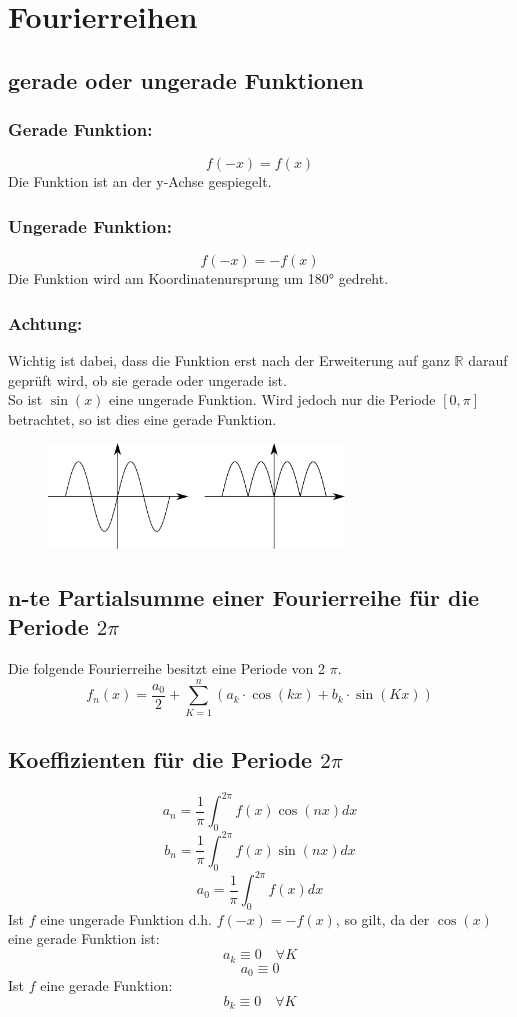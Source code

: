 \section{Fourierreihen}

\subsection{gerade oder ungerade Funktionen}

\subsubsection{Gerade Funktion: }
\[ \boxed{f(-x) = f(x)} \]
Die Funktion ist an der y-Achse gespiegelt. 
\subsubsection{Ungerade Funktion: }
\[ \boxed{f(-x) = -f(x)} \]
Die Funktion wird am Koordinatenursprung um 180° gedreht. 
\subsubsection{Achtung: }
Wichtig ist dabei, dass die Funktion erst nach der Erweiterung auf ganz $\mathbb{R}$ darauf geprüft wird, ob sie gerade oder ungerade ist. \\
So ist $\sin(x)$ eine ungerade Funktion. Wird jedoch nur die Periode $[0, \pi]$ betrachtet, so ist dies eine gerade Funktion. 

\begin{figure}[h!]
\centering
\includegraphics[width=0.7\textwidth]{geradeungerade.pdf}
\end{figure}

\subsection{n-te Partialsumme einer Fourierreihe für die Periode $2\pi$}
Die folgende Fourierreihe besitzt eine Periode von 2 $\pi$. 
\[ \boxed{f_n(x) = \frac{a_0}{2} + \sum_{K=1}^n \left(a_k \cdot \cos(kx) + b_k \cdot \sin(Kx)\right)} \]

\subsection{Koeffizienten für die Periode $2\pi$}
\[ \boxed{a_n = \frac{1}{\pi} \int_0^{2 \pi} f(x) \cos(nx) dx} \]
\[ \boxed{b_n = \frac{1}{\pi} \int_0^{2 \pi} f(x) \sin(nx) dx} \]
\[ \boxed{a_0 = \frac{1}{\pi} \int_0^{2 \pi} f(x) dx
} \]
Ist $f$ eine ungerade Funktion d.h. $f(-x) = -f(x)$, so gilt, da der $\cos(x)$ eine gerade Funktion ist: 
\[ a_k \equiv 0 \quad \forall K\]
\[ a_0 \equiv 0 \]
Ist $f$ eine gerade Funktion: 
\[ b_k \equiv 0 \quad \forall K \]

